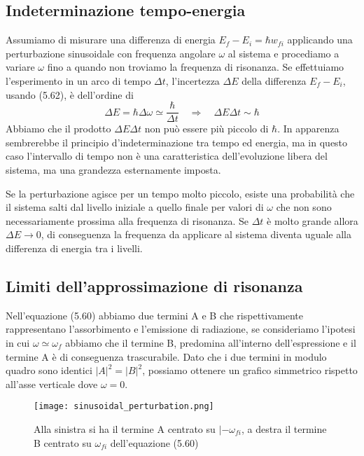 \subsection{Indeterminazione tempo-energia}

Assumiamo di misurare una differenza di energia $E_f - E_i = \hbar w_{fi}$ applicando una perturbazione sinusoidale con frequenza angolare $\omega$ al sistema e procediamo a variare $\omega$ fino a quando non troviamo la frequenza di risonanza. Se effettuiamo l'esperimento in un arco di tempo $\Delta t$, l'incertezza $\Delta E$ della differenza $E_f -E_i$, usando (5.62), \`e dell'ordine di
\begin{equation*}
	\Delta E = \hbar \Delta \omega \simeq \frac{\hbar}{\Delta t} \quad \Rightarrow \quad \Delta E \Delta t \sim \hbar
\end{equation*}
Abbiamo che il prodotto $\Delta E \Delta t$ non pu\`o essere pi\`u piccolo di $\hbar$. In apparenza sembrerebbe il principio d'indeterminazione tra tempo ed energia, ma in questo caso l'intervallo di tempo non \`e una caratteristica dell'evoluzione libera del sistema, ma una grandezza esternamente imposta.

Se la perturbazione agisce per un tempo molto piccolo, esiste una probabilit\`a che il sistema salti dal livello iniziale a quello finale per valori di $\omega$ che non sono necessariamente prossima alla frequenza di risonanza. Se $\Delta t $ \`e molto grande allora $\Delta E \to 0$, di conseguenza la frequenza da applicare al sistema diventa uguale alla differenza di energia tra i livelli.

\subsection{Limiti dell'approssimazione di risonanza}
Nell'equazione (5.60) abbiamo due termini A e B che rispettivamente rappresentano l'assorbimento e l'emissione di radiazione, se consideriamo l'ipotesi in cui $\omega \simeq \omega_{f}$ abbiamo che il termine B, predomina all'interno dell'espressione e il termine A \`e di conseguenza trascurabile. Dato che i due termini in modulo quadro sono identici $|A|^2=|B|^2$, possiamo ottenere un grafico simmetrico rispetto all'asse verticale dove $\omega = 0$.
\begin{figure}[!ht]
\texttt{[image: sinusoidal\_perturbation.png]}	
\centering
\caption{Alla sinistra si ha il termine A centrato su $|- \omega_{fi}$, a destra il termine B centrato su $\omega_{fi}$ dell'equazione (5.60)}
\end{figure}

